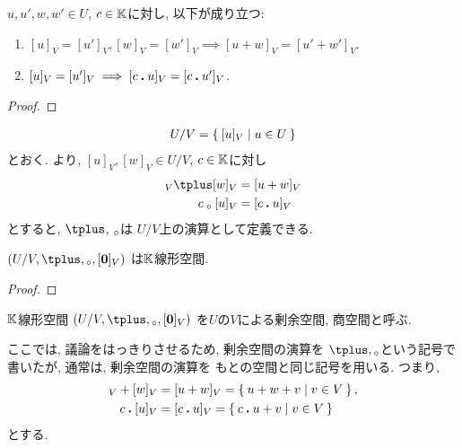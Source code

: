 \begin{lemma}
\label{lem:quotientspace:well:def}
  $u,u',w,w'\in U$, $c\in \mathbb{K}$に対し, 以下が成り立つ:  
  \begin{enumerate}
  \item $[u]_V=[u']_V, [w]_V=[w']_V \implies [u+w]_V=[u'+w']_V$.
  \item $[u]_V=[u']_V \implies [c\mathbin{\boldsymbol{.}} u]_V=[c\mathbin{\boldsymbol{.}} u']_V$.
  \end{enumerate}
\end{lemma}
\begin{proof}\end{proof}

\begin{align*}
  U/V=\Set{[u]_V|u\in U}
\end{align*}
とおく.
より,
$[u]_V,[w]_V\in U/V$, $c\in\mathbb{K}$に対し
\begin{align*}
[u]_V\pplus [w]_V &= [u+w]_V\\
c\aact [u]_V &= [c\act u]_V
\end{align*}
とすると,
$\pplus$, $\mathbin{{}_\circ}$は
$U/V$上の演算として定義できる.
\begin{lemma}
  $(U/V,\pplus,\aact,[\zzero]_V)$
  は$\mathbb{K}$線形空間.
\end{lemma}
\begin{proof}\end{proof}
\begin{definition}
  $\mathbb{K}$線形空間
  $(U/V,\pplus,\aact,[\zzero]_V)$
  を$U$の$V$による剰余空間, 商空間と呼ぶ.
\end{definition}

\begin{remark}
  ここでは,
  議論をはっきりさせるため,
  剰余空間の演算を
  $\pplus,\aact$という記号で書いたが,
  通常は,
  剰余空間の演算を
  もとの空間と同じ記号を用いる.
  つまり,
  \begin{align*}
    [u]_V+[w]_V&=[u+w]_V=\Set{u+w+v|v\in V}, \\
    c\act [u]_V&=[c\act u]_V=\Set{c\act u +v|v\in V}
  \end{align*}
  とする.
\end{remark}

